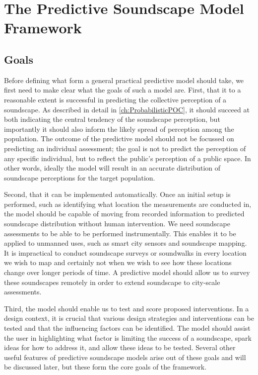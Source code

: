 \chapter{The Predictive Soundscape Model Framework}
\label{ch:bayes}

\section{Goals}
Before defining what form a general practical predictive model should take, we first need to make clear what the goals of such a model are. First, that it to a reasonable extent is successful in predicting the collective perception of a soundscape. As described in detail in \cref{ch:ProbabilisticPOC}, it should succeed at both indicating the central tendency of the soundscape perception, but importantly it should also inform the likely spread of perception among the population. The outcome of the predictive model should not be focussed on predicting an individual assessment; the goal is not to predict the perception of any specific individual, but to reflect the public's perception of a public space. In other words, ideally the model will result in an accurate distribution of soundscape perceptions for the target population. 

Second, that it can be implemented automatically. Once an initial setup is performed, such as identifying what location the measurements are conducted in, the model should be capable of moving from recorded information to predicted soundscape distribution without human intervention. We need soundscape assessments to be able to be performed instrumentally. This enables it to be applied to unmanned uses, such as smart city sensors and soundscape mapping. It is impractical to conduct soundscape surveys or soundwalks in every location we wish to map and certainly not when we wish to see how these locations change over longer periods of time. A predictive model should allow us to survey these soundscapes remotely in order to extend soundscape to city-scale assessments. 

Third, the model should enable us to test and score proposed interventions. In a design context, it is crucial that various design strategies and interventions can be tested and that the influencing factors can be identified. The model should assist the user in highlighting what factor is limiting the success of a soundscape, spark ideas for how to address it, and allow these ideas to be tested. Several other useful features of predictive soundscape models arise out of these goals and will be discussed later, but these form the core goals of the framework.

